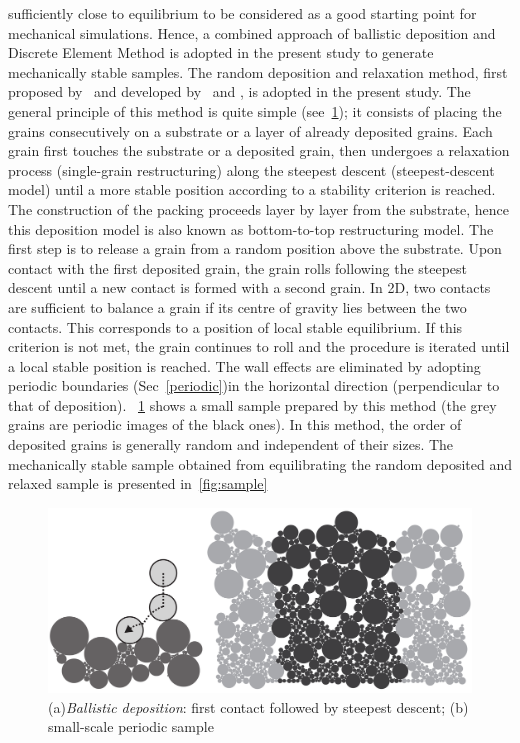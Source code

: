 sufficiently close to 
equilibrium to be considered as a good starting point for mechanical 
simulations. Hence, a 
combined 
approach of ballistic deposition and Discrete Element Method is adopted in the 
present study 
to generate mechanically stable samples. The random deposition and relaxation 
method, first 
proposed by~\citet{vold1959a,vold1959b} and developed by~\citet{jullien1992} 
and 
\citet{meakin1985}, is adopted in the present study. The general principle of 
this method is quite 
simple (see~\cref{fig:ballistic}); it consists of placing the grains 
consecutively on a 
substrate or a layer of already deposited grains. Each grain first 
touches the substrate or 
a 
deposited grain, then undergoes a relaxation process (single-grain 
restructuring) along the 
steepest descent (steepest-descent model) until a more stable position 
according to a stability 
criterion is reached. The construction of the packing proceeds layer by layer 
from the substrate, 
hence this deposition model is also known as bottom-to-top restructuring model. 
The first step is 
to release a grain from a random position above the substrate. Upon contact 
with the first 
deposited grain, the grain rolls following the steepest descent until a 
new contact is 
formed 
with a second grain. In 2D, two contacts are sufficient to balance a 
grain if its centre of 
gravity lies between the two contacts. This corresponds to a position of local 
stable equilibrium. 
If this criterion is not met, the grain continues to roll and the procedure 
is iterated until a 
local stable position is reached. The wall effects are eliminated by adopting 
periodic boundaries 
(Sec~\ref{periodic})in the horizontal direction (perpendicular to that of 
deposition). 
~\cref{fig:ballistic} shows a small sample prepared by this method (the grey 
grains are 
periodic images of the black ones). In this method, the order of deposited 
grains is generally 
random and independent of their sizes. The mechanically stable sample obtained 
from equilibrating 
the random deposited and relaxed sample is presented in~\cref{fig:sample} 
\begin{figure}[htbp]
\centering
\includegraphics[scale=0.1]{ballistic}
\caption{(a)\textit{Ballistic deposition}: first contact followed by steepest 
descent; (b) 
small-scale periodic sample~\citep{Radjai2011}}
\label{fig:ballistic}
\end{figure} 

